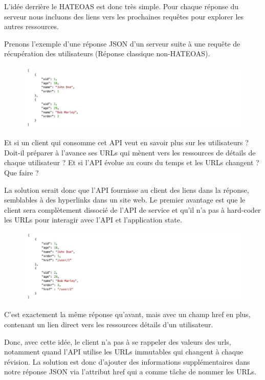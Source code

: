 L’idée derrière le HATEOAS est donc très simple. Pour chaque réponse du serveur nous incluons des 
liens vers les prochaines requêtes pour explorer les autres ressources.
\pagebreak

Prenons l’exemple d’une réponse JSON d’un serveur suite à une requête de récupération des utilisateurs (Réponse classique non-HATEOAS).
\begin{figure}[hp]
    \centering
    \includegraphics{images/nohtaos.png}
\end{figure}

Et si un client qui consomme cet API veut en savoir plus sur les utilisateurs ? 
Doit-il préparer à l’avance ses URLs qui mènent vers les ressources de détails de chaque utilisateur ? 
Et si l’API évolue au cours du temps et les URLs changent ? Que faire ?

La solution serait donc que l’API fournisse au client des liens dans la réponse, 
semblables à des hyperlinks dans un site web. Le premier avantage est que le client sera 
complètement dissocié de l’API de service et qu’il n’a pas à hard-coder les URLs pour interagir avec 
l’API et l’application state.
\begin{figure}[hp]
    \centering
    \includegraphics{images/htaos.png}
\end{figure}

C’est exactement la même réponse qu’avant, mais avec un champ href en plus, contenant un lien direct vers 
les ressources détails d’un utilisateur. 

Donc, avec cette idée, le client n’a pas à se rappeler des valeurs des urls, notamment quand 
l’API utilise les URLs immutables qui changent à chaque révision. La solution est donc d’ajouter 
des informations supplémentaires dans notre réponse JSON via l’attribut href qui a comme tâche de
 nommer les URLs.

